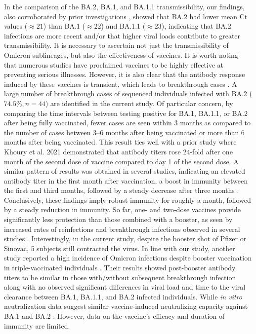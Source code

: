 In the comparison of the BA.2, BA.1, and BA.1.1 transmissibility, our findings, also corroborated by prior investigations \cite{qassim2022effects, lentini2022monitoring, kirsebom2022covid}, showed that BA.2 had lower mean Ct values ($\approx21$) than BA.1 ($\approx22$) and BA.1.1 ($\approx23$), indicating that BA.2 infections are more recent and/or that higher viral loads contribute to greater transmissibility.
It is necessary to ascertain not just the transmissibility of Omicron sublineages, but also the effectiveness of vaccines.
It is worth noting that numerous studies have proclaimed vaccines to be highly effective at preventing serious illnesses. %
However, it is also clear that the antibody response induced by these vaccines is transient, which leads to breakthrough cases \cite{haque2022mitigating, bruel2022serum, seaman2022vaccine}.
A large number of breakthrough cases of sequenced individuals infected with BA.2 ($74.5\%, n=44$) are identified in the current study.
Of particular concern, by comparing the time intervals between testing positive for BA.1, BA.1.1, or BA.2 after being fully vaccinated, fewer cases are seen within 3 months as compared to the number of cases between 3--6 months after being vaccinated or more than 6 months after being vaccinated.
This result ties well with a prior study where Khoury et al. 2021 \cite{khoury2021covid} demonstrated that antibody titers rose 24-fold after one month of the second dose of vaccine compared to day 1 of the second dose.
A similar pattern of results was obtained in several studies, indicating an elevated antibody titer in the first month after vaccination, a boost in immunity between the first and third months, followed by a steady decrease after three months \cite{chemaitelly2021waning, levin2021waning}.
Conclusively, these findings imply robust immunity for roughly a month, followed by a steady reduction in immunity.
So far, one- and two-dose vaccines provide significantly less protection than those combined with a booster, as seen by increased rates of reinfections and breakthrough infections observed in several studies \cite{healthline-covid19-vaccines, stasi2022sars}.
Interestingly, in the current study, despite the booster shot of Pfizer or Sinovac, 5 subjects still contracted the virus.
In line with our study, another study reported a high incidence of Omicron infections despite booster vaccination in triple-vaccinated individuals \cite{marking2022high}. 
Their results showed post-booster antibody titers to be similar in those with/without subsequent breakthrough infection along with no observed significant differences in viral load and time to the viral clearance between BA.1, BA.1.1, and BA.2 infected individuals.
While \textit{in vitro} neutralization data suggest similar vaccine-induced neutralizing capacity against BA.1 and BA.2 \cite{evans2022neutralization}.
However, data on the vaccine's efficacy and duration of immunity are limited.

